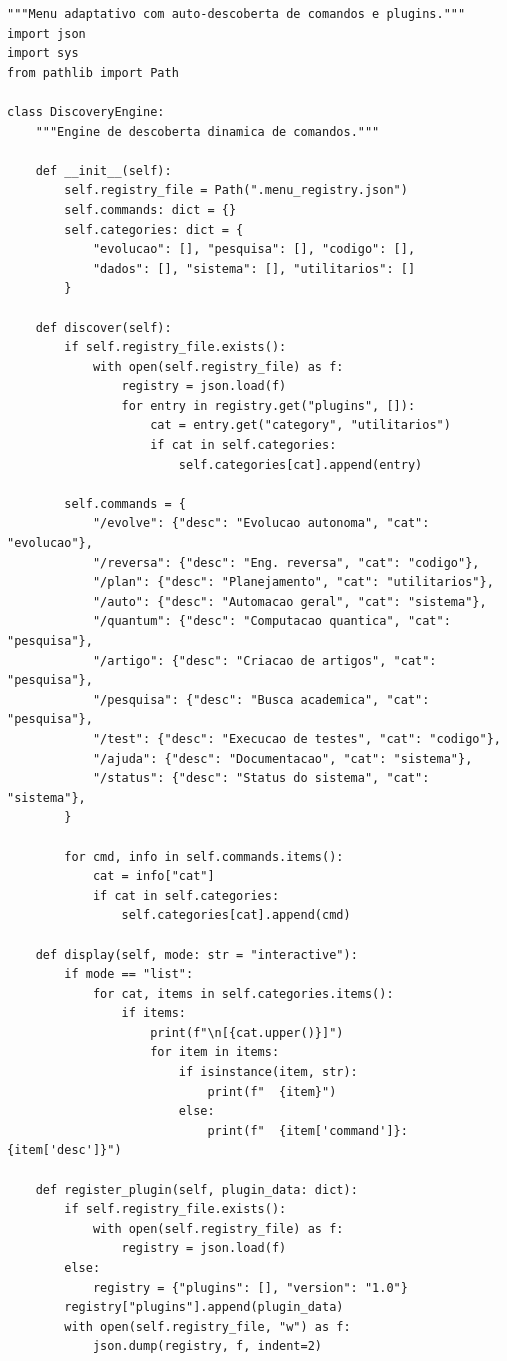 \begin{lstlisting}[style=pythonstyle, caption={Menu adaptativo com Discovery Engine},
                   label={lst:menu-adaptativo}]
"""Menu adaptativo com auto-descoberta de comandos e plugins."""
import json
import sys
from pathlib import Path

class DiscoveryEngine:
    """Engine de descoberta dinamica de comandos."""

    def __init__(self):
        self.registry_file = Path(".menu_registry.json")
        self.commands: dict = {}
        self.categories: dict = {
            "evolucao": [], "pesquisa": [], "codigo": [],
            "dados": [], "sistema": [], "utilitarios": []
        }

    def discover(self):
        if self.registry_file.exists():
            with open(self.registry_file) as f:
                registry = json.load(f)
                for entry in registry.get("plugins", []):
                    cat = entry.get("category", "utilitarios")
                    if cat in self.categories:
                        self.categories[cat].append(entry)

        self.commands = {
            "/evolve": {"desc": "Evolucao autonoma", "cat": "evolucao"},
            "/reversa": {"desc": "Eng. reversa", "cat": "codigo"},
            "/plan": {"desc": "Planejamento", "cat": "utilitarios"},
            "/auto": {"desc": "Automacao geral", "cat": "sistema"},
            "/quantum": {"desc": "Computacao quantica", "cat": "pesquisa"},
            "/artigo": {"desc": "Criacao de artigos", "cat": "pesquisa"},
            "/pesquisa": {"desc": "Busca academica", "cat": "pesquisa"},
            "/test": {"desc": "Execucao de testes", "cat": "codigo"},
            "/ajuda": {"desc": "Documentacao", "cat": "sistema"},
            "/status": {"desc": "Status do sistema", "cat": "sistema"},
        }

        for cmd, info in self.commands.items():
            cat = info["cat"]
            if cat in self.categories:
                self.categories[cat].append(cmd)

    def display(self, mode: str = "interactive"):
        if mode == "list":
            for cat, items in self.categories.items():
                if items:
                    print(f"\n[{cat.upper()}]")
                    for item in items:
                        if isinstance(item, str):
                            print(f"  {item}")
                        else:
                            print(f"  {item['command']}: {item['desc']}")

    def register_plugin(self, plugin_data: dict):
        if self.registry_file.exists():
            with open(self.registry_file) as f:
                registry = json.load(f)
        else:
            registry = {"plugins": [], "version": "1.0"}
        registry["plugins"].append(plugin_data)
        with open(self.registry_file, "w") as f:
            json.dump(registry, f, indent=2)
\end{lstlisting}

